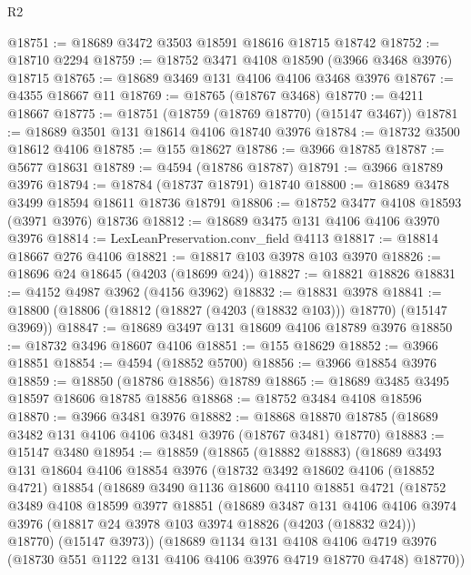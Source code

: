 \begin{lexlean}{R2}
\begin{coremodule}
@18751 := @18689 @3472 @3503 @18591 @18616 @18715 @18742
@18752 := @18710 @2294
@18759 := @18752 @3471 @4108 @18590 (@3966 @3468 @3976) @18715
@18765 := @18689 @3469 @131 @4106 @4106 @3468 @3976
@18767 := @4355 @18667 @11
@18769 := @18765 (@18767 @3468)
@18770 := @4211 @18667
@18775 := @18751 (@18759 (@18769 @18770) (@15147 @3467))
@18781 := @18689 @3501 @131 @18614 @4106 @18740 @3976
@18784 := @18732 @3500 @18612 @4106
@18785 := @155 @18627
@18786 := @3966 @18785
@18787 := @5677 @18631
@18789 := @4594 (@18786 @18787)
@18791 := @3966 @18789 @3976
@18794 := @18784 (@18737 @18791) @18740
@18800 := @18689 @3478 @3499 @18594 @18611 @18736 @18791
@18806 := @18752 @3477 @4108 @18593 (@3971 @3976) @18736
@18812 := @18689 @3475 @131 @4106 @4106 @3970 @3976
@18814 := LexLeanPreservation.conv_field @4113
@18817 := @18814 @18667 @276 @4106
@18821 := @18817 @103 @3978 @103 @3970
@18826 := @18696 @24 @18645 (@4203 (@18699 @24))
@18827 := @18821 @18826
@18831 := @4152 @4987 @3962 (@4156 @3962)
@18832 := @18831 @3978
@18841 := @18800 (@18806 (@18812 (@18827 (@4203 (@18832 @103))) @18770) (@15147 @3969))
@18847 := @18689 @3497 @131 @18609 @4106 @18789 @3976
@18850 := @18732 @3496 @18607 @4106
@18851 := @155 @18629
@18852 := @3966 @18851
@18854 := @4594 (@18852 @5700)
@18856 := @3966 @18854 @3976
@18859 := @18850 (@18786 @18856) @18789
@18865 := @18689 @3485 @3495 @18597 @18606 @18785 @18856
@18868 := @18752 @3484 @4108 @18596
@18870 := @3966 @3481 @3976
@18882 := @18868 @18870 @18785 (@18689 @3482 @131 @4106 @4106 @3481 @3976 (@18767 @3481) @18770)
@18883 := @15147 @3480
@18954 := @18859
    (@18865
      (@18882 @18883)
      (@18689
        @3493
        @131
        @18604
        @4106
        @18854
        @3976
        (@18732
          @3492
          @18602
          @4106
          (@18852 @4721)
          @18854
          (@18689
            @3490
            @1136
            @18600
            @4110
            @18851
            @4721
            (@18752
              @3489
              @4108
              @18599
              @3977
              @18851
              (@18689
                @3487
                @131
                @4106
                @4106
                @3974
                @3976
                (@18817 @24 @3978 @103 @3974 @18826 (@4203 (@18832 @24)))
                @18770)
              (@15147 @3973))
            (@18689
              @1134
              @131
              @4108
              @4106
              @4719
              @3976
              (@18730 @551 @1122 @131 @4106 @4106 @3976 @4719 @18770 @4748)
              @18770))

\end{coremodule}
\end{lexlean}
